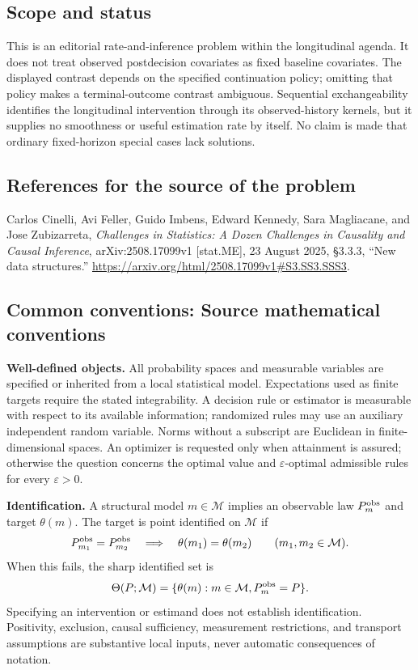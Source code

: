 \documentclass[11pt,a4paper]{article}
\begin{document}
\subsection*{Scope and status}
This is an editorial rate-and-inference problem within the longitudinal agenda. It does not treat observed postdecision covariates as fixed baseline covariates. The displayed contrast depends on the specified continuation policy; omitting that policy makes a terminal-outcome contrast ambiguous. Sequential exchangeability identifies the longitudinal intervention through its observed-history kernels, but it supplies no smoothness or useful estimation rate by itself. No claim is made that ordinary fixed-horizon special cases lack solutions.
\subsection*{References for the source of the problem}
Carlos Cinelli, Avi Feller, Guido Imbens, Edward Kennedy, Sara Magliacane, and Jose Zubizarreta, \emph{Challenges in Statistics: A Dozen Challenges in Causality and Causal Inference}, arXiv:2508.17099v1 [stat.ME], 23 August 2025, \S3.3.3, ``New data structures.'' \url{https://arxiv.org/html/2508.17099v1#S3.SS3.SSS3}.

\subsection*{Common conventions: Source mathematical conventions}

\textbf{Well-defined objects.}
All probability spaces and measurable variables are specified or inherited
from a local statistical model. Expectations used as finite targets require
the stated integrability. A decision rule or estimator is measurable with
respect to its available information; randomized rules may use an auxiliary
independent random variable. Norms without a subscript are Euclidean in
finite-dimensional spaces. An optimizer is requested only when attainment
is assured; otherwise the question concerns the optimal value and
$\varepsilon$-optimal admissible rules for every $\varepsilon>0$.

\textbf{Identification.}
A structural model $m\in\mathcal M$ implies an observable law
$P_m^{\rm obs}$ and target $\theta(m)$. The target is point identified on
$\mathcal M$ if
\[
 P_{m_1}^{\rm obs}=P_{m_2}^{\rm obs}
 \quad\Longrightarrow\quad\theta(m_1)=\theta(m_2)
 \qquad(m_1,m_2\in\mathcal M).
\]
When this fails, the sharp identified set is
\[
 \Theta(P;\mathcal M)=\{\theta(m):m\in\mathcal M,
                                  P_m^{\rm obs}=P\}.
\]
Specifying an intervention or estimand does not establish identification.
Positivity, exclusion, causal sufficiency, measurement restrictions, and
transport assumptions are substantive local inputs, never automatic
consequences of notation.
\end{document}
